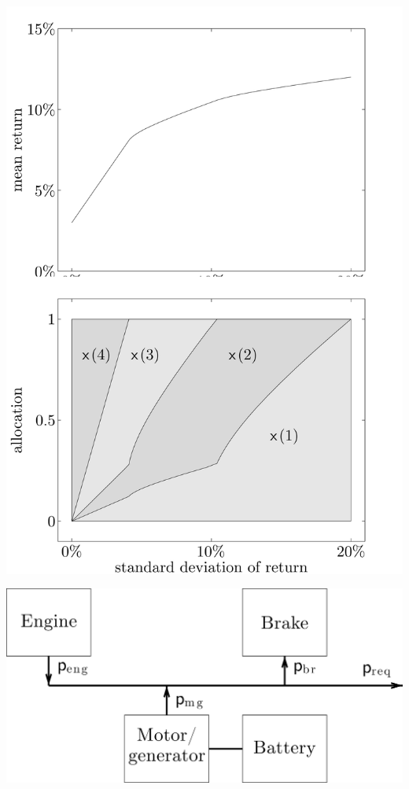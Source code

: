 \clearpage
\hfil\includegraphics[width=.5\textwidth]{../Graphics/187.png}\hfil

\clearpage
\hfil\includegraphics[width=.5\textwidth]{../Graphics/212.png}\hfil


